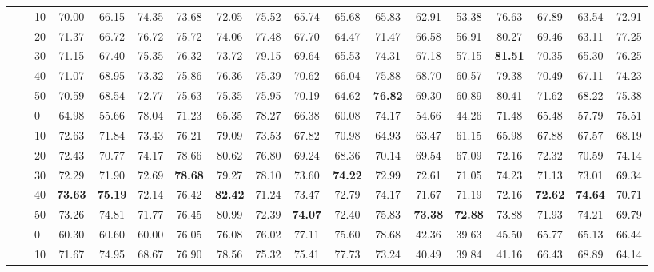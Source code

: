 \begin{table*}[!h]
{\begin{tabular}{lllccc|ccc|ccc|ccc|ccc}
 \textbf{} & \textbf{} & 10 & 70.00 & 66.15 & 74.35 & 73.68 & 72.05 & 75.52 & 65.74 & 65.68 & 65.83 & 62.91 & 53.38 & 76.63 & 67.89 & 63.54 & 72.91 \\ 
 \textbf{} & \textbf{} & 20 & 71.37 & 66.72 & 76.72 & 75.72 & 74.06 & 77.48 & 67.70 & 64.47 & 71.47 & 66.58 & 56.91 & 80.27 & 69.46 & 63.11 & 77.25 \\ 
 \textbf{} & \textbf{} & 30 & 71.15 & 67.40 & 75.35 & 76.32 & 73.72 & 79.15 & 69.64 & 65.53 & 74.31 & 67.18 & 57.15 & \textbf{81.51} & 70.35 & 65.30 & 76.25 \\ 
 \textbf{} & \textbf{} & 40 & 71.07 & 68.95 & 73.32 & 75.86 & 76.36 & 75.39 & 70.62 & 66.04 & 75.88 & 68.70 & 60.57 & 79.38 & 70.49 & 67.11 & 74.23 \\ 
 \textbf{} & \textbf{} & 50 & 70.59 & 68.54 & 72.77 & 75.63 & 75.35 & 75.95 & 70.19 & 64.62 & \textbf{76.82} & 69.30 & 60.89 & 80.41 & 71.62 & 68.22 & 75.38 \\ 
 \arrayrulecolor{gray}\cline{2-18}\arrayrulecolor{black}
\textbf{} & \textbf{\multirow{6}{*}{SC}} & 0 & 64.98 & 55.66 & 78.04 & 71.23 & 65.35 & 78.27 & 66.38 & 60.08 & 74.17 & 54.66 & 44.26 & 71.48 & 65.48 & 57.79 & 75.51 \\ 
 \textbf{} & \textbf{} & 10 & 72.63 & 71.84 & 73.43 & 76.21 & 79.09 & 73.53 & 67.82 & 70.98 & 64.93 & 63.47 & 61.15 & 65.98 & 67.88 & 67.57 & 68.19 \\ 
 \textbf{} & \textbf{} & 20 & 72.43 & 70.77 & 74.17 & 78.66 & 80.62 & 76.80 & 69.24 & 68.36 & 70.14 & 69.54 & 67.09 & 72.16 & 72.32 & 70.59 & 74.14 \\ 
 \textbf{} & \textbf{} & 30 & 72.29 & 71.90 & 72.69 & \textbf{78.68} & 79.27 & 78.10 & 73.60 & \textbf{74.22} & 72.99 & 72.61 & 71.05 & 74.23 & 71.13 & 73.01 & 69.34 \\ 
 \textbf{} & \textbf{} & 40 & \textbf{73.63} & \textbf{75.19} & 72.14 & 76.42 & \textbf{82.42} & 71.24 & 73.47 & 72.79 & 74.17 & 71.67 & 71.19 & 72.16 & \textbf{72.62} & \textbf{74.64} & 70.71 \\ 
 \textbf{} & \textbf{} & 50 & 73.26 & 74.81 & 71.77 & 76.45 & 80.99 & 72.39 & \textbf{74.07} & 72.40 & 75.83 & \textbf{73.38} & \textbf{72.88} & 73.88 & 71.93 & 74.21 & 69.79 \\ 
\hline
\arrayrulecolor{gray}\cline{2-18}\arrayrulecolor{black}
\textbf{\multirow{12}{*}{Aspect Category}} & \textbf{\multirow{6}{*}{-}} & 0 & 60.30 & 60.60 & 60.00 & 76.05 & 76.08 & 76.02 & 77.11 & 75.60 & 78.68 & 42.36 & 39.63 & 45.50 & 65.77 & 65.13 & 66.44 \\ 
 \textbf{} & \textbf{} & 10 & 71.67 & 74.95 & 68.67 & 76.90 & 78.56 & 75.32 & 75.41 & 77.73 & 73.24 & 40.49 & 39.84 & 41.16 & 66.43 & 68.89 & 64.14 \\ 

\end{tabular}}
\end{table*}

